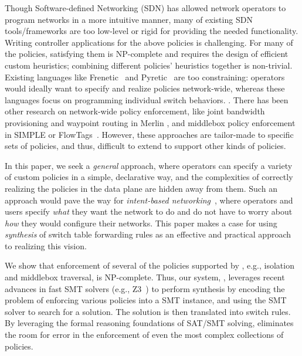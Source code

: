 Though Software-defined Networking (SDN) has allowed network operators
to program networks in a more intuitive manner, many of existing SDN
tools/frameworks are too low-level or rigid for providing the needed
functionality. Writing controller applications for the above policies
is challenging. For many of the policies, satisfying them is
NP-complete and requires the design of efficient custom heuristics;
combining different policies' heuristics together is
non-trivial. Existing languages like Frenetic~\cite{frenetic} and
Pyretic~\cite{pyretic} are too constraining: operators would ideally
want to specify and realize policies network-wide, whereas these
languages focus on programming individual switch behaviors. .  There has been other research on
network-wide policy enforcement, like joint bandwidth provisioning and
waypoint routing in Merlin \cite{Merlin}, and middlebox policy
enforcement in SIMPLE \cite{simple} or
FlowTags~\cite{flowtags}. However, these approaches are tailor-made to
specific sets of policies, and thus, difficult to extend to support
other kinds of policies.

In this paper, we seek a {\em general} approach, where operators can
specify a variety of custom policies in a simple, declarative way, and
the complexities of correctly realizing the policies in the data plane
are hidden away from them. Such an approach would pave the way for
{\em intent-based networking}~\cite{}, where operators and users
specify {\em what} they want the network to do and do not have to
worry about {\em how} they would configure their
networks. %
This paper makes a case for using \emph{synthesis} of switch table
forwarding rules as an effective and practical approach to realizing
this vision.

We show that enforcement of several of the policies supported by
\Name, e.g., isolation and middlebox traversal, is NP-complete. Thus,
our system, \Name, leverages recent advances in fast SMT solvers
(e.g., Z3~\cite{z3}) to perform synthesis by encoding the problem of
enforcing various policies into a SMT instance, and using the SMT
solver to search for a solution. The solution is then translated into
switch rules. %
By leveraging the formal reasoning foundations of SAT/SMT solving,
\Name eliminates the room for error in the enforcement of even the
most complex collections of policies.

